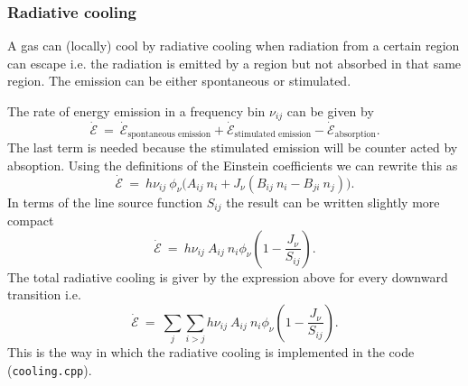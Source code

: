 \documentclass[]{article}
\begin{document}
\subsubsection{Radiative cooling}

A gas can (locally) cool by radiative cooling when radiation from a certain region can escape i.e. the radiation is emitted by a region but not absorbed in that same region. The emission can be either spontaneous or stimulated.

\bigskip

The rate of energy emission in a frequency bin $\nu_{ij}$ can be given by
\begin{equation}
\dot{\mathcal{E}} \ = \ \dot{\mathcal{E}}_{\text{spontaneous emission}} + \dot{\mathcal{E}}_{\text{stimulated emission}} - \dot{\mathcal{E}}_{\text{absorption}} .
\end{equation}
The last term is needed because the stimulated emission will be counter acted by absoption. Using the definitions of the Einstein coefficients we can rewrite this as
\begin{equation}
\dot{\mathcal{E}} \ = \ h\nu_{ij} \ \phi_{\nu} \Big( A_{ij} \ n_{i}  + J_{\nu} \left( B_{ij} \ n_{i} - B_{ji} \ n_{j} \right) \Big).
\end{equation}
In terms of the line source function $S_{ij}$ the result can be written slightly more compact
\begin{equation}
\dot{\mathcal{E}} \ = \ h\nu_{ij} \ A_{ij} \ n_{i}  \phi_{\nu} \left( 1  - \frac{J_{\nu}}{S_{ij}} \right).
\end{equation}
The total radiative cooling is giver by the expression above for every downward transition i.e.
\begin{equation}
\dot{\mathcal{E}} \ = \ \sum_{j} \sum_{i>j} h\nu_{ij} \ A_{ij} \ n_{i}  \phi_{\nu} \left( 1  - \frac{J_{\nu}}{S_{ij}} \right).
\end{equation}
This is the way in which the radiative cooling is implemented in the code (\texttt{cooling.cpp}).


\newpage



\end{document}
